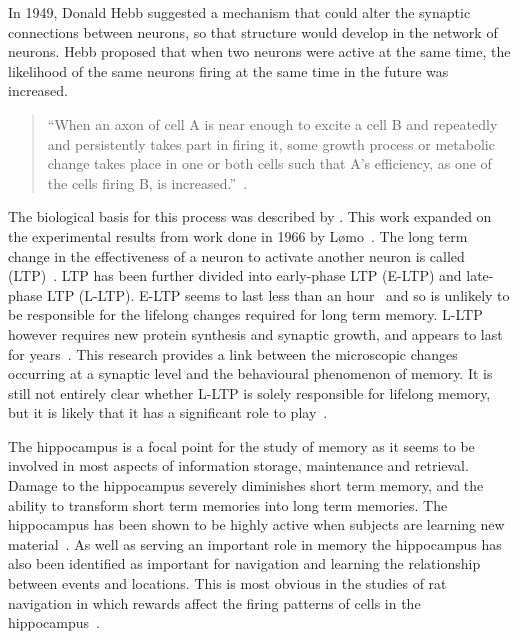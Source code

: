 In 1949, Donald Hebb suggested a mechanism that could alter the synaptic connections between neurons, so that structure would develop in the network of neurons.  Hebb proposed that when two neurons were active at the same time, the likelihood of the same neurons firing at the same time in the future was increased.
\begin{quotation}
``When an axon of cell A is near enough to excite a cell B and repeatedly and persistently takes part in firing it, some growth process or metabolic change takes place in one or both cells such that A's efficiency, as one of the cells firing B, is increased.''~\citet{Hebb49}.
\end{quotation}

The biological basis for this process was described by \citet{Bliss1973}.  This work expanded on the experimental results from work done in 1966 by L{\o}mo~\citep{Lomo2003,Bliss2003}. The long term change in the effectiveness of a neuron to activate another neuron is called  (LTP)~\citep{Bliss1973}. LTP has been further divided into early-phase LTP (E-LTP) and late-phase LTP (L-LTP).  E-LTP seems to last less than an hour~\citep{Mayford1995} and so is unlikely to be responsible for the lifelong changes required for long term memory.  L-LTP however requires new protein synthesis and synaptic growth, and appears to last for years~\citep{Abel1997}.  This research provides a link between the microscopic changes occurring at a synaptic level and the behavioural phenomenon of memory.  It is still not entirely clear whether L-LTP is solely responsible for lifelong memory, but it is likely that it has a significant role to play~\citep{Abraham2000}.  

The hippocampus is a focal point for the study of memory as it seems to be involved in most aspects of information storage, maintenance and retrieval.  Damage to the hippocampus severely diminishes short term memory, and the ability to transform short term memories into long term memories.  The hippocampus has been shown to be highly active when subjects are learning new material~\citep{Davachi2003}. As well as serving an important role in memory the hippocampus has also been identified as important for navigation and learning the relationship between events and locations. This is most obvious in the studies of rat navigation in which rewards affect the firing patterns of cells in the hippocampus~\citep{Burgess94}.

